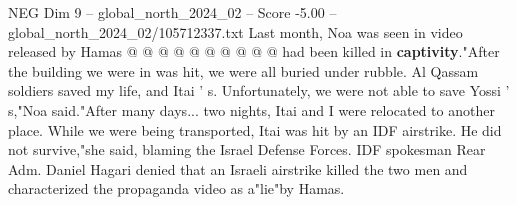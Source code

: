 \begin{textsample}{NEG Dim 9 – global\_north\_2024\_02 – Score -5.00 – global\_north\_2024\_02/105712337.txt}
Last month, Noa was seen in video released by Hamas @ @ @ @ @ @ @ @ @ @ had been killed in \textbf{captivity}."After the building we were in was hit, we were all buried under rubble.
Al Qassam soldiers saved my life, and Itai ' s.
Unfortunately, we were not able to save Yossi ' s,"Noa said."After many days... two nights, Itai and I were relocated to another place.
While we were being transported, Itai was hit by an IDF airstrike.
He did not survive,"she said, blaming the Israel Defense Forces.
IDF spokesman Rear Adm.
Daniel Hagari denied that an Israeli airstrike killed the two men and characterized the propaganda video as a"lie"by Hamas.

\end{textsample}
